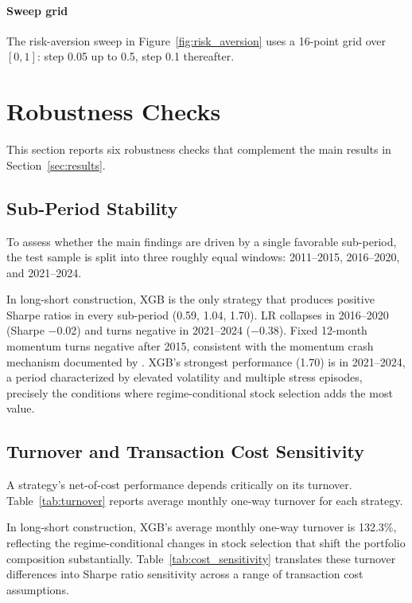 \paragraph{Sweep grid} The risk-aversion sweep in Figure~\ref{fig:risk_aversion} uses a 16-point grid over $[0, 1]$: step 0.05 up to 0.5, step 0.1 thereafter.

\section{Robustness Checks}\label{app:robustness}

This section reports six robustness checks that complement the main results in Section~\ref{sec:results}.

\subsection{Sub-Period Stability}\label{app:subperiod}

To assess whether the main findings are driven by a single favorable sub-period, the test sample is split into three roughly equal windows: 2011--2015, 2016--2020, and 2021--2024.



In long-short construction, XGB is the only strategy that produces positive Sharpe ratios in every sub-period (0.59, 1.04, 1.70). LR collapses in 2016--2020 (Sharpe $-$0.02) and turns negative in 2021--2024 ($-$0.38). Fixed 12-month momentum turns negative after 2015, consistent with the momentum crash mechanism documented by \citet{DanielMoskowitz2016}. XGB's strongest performance (1.70) is in 2021--2024, a period characterized by elevated volatility and multiple stress episodes, precisely the conditions where regime-conditional stock selection adds the most value.

\subsection{Turnover and Transaction Cost Sensitivity}\label{app:turnover}

A strategy's net-of-cost performance depends critically on its turnover. Table~\ref{tab:turnover} reports average monthly one-way turnover for each strategy.



In long-short construction, XGB's average monthly one-way turnover is 132.3\%, reflecting the regime-conditional changes in stock selection that shift the portfolio composition substantially. Table~\ref{tab:cost_sensitivity} translates these turnover differences into Sharpe ratio sensitivity across a range of transaction cost assumptions.


